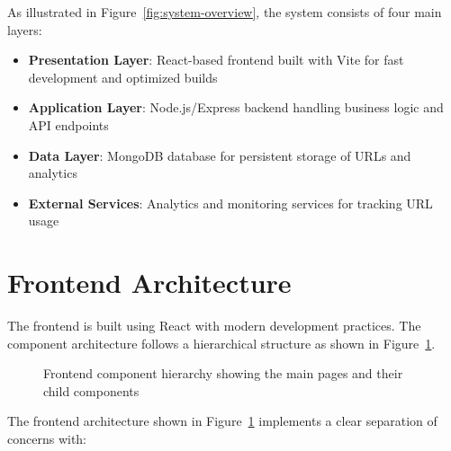 \documentclass[11pt,a4paper]{article}
\begin{document}
As illustrated in Figure~\ref{fig:system-overview}, the system consists of four main layers:

\begin{itemize}
    \item \textbf{Presentation Layer}: React-based frontend built with Vite for fast development and optimized builds
    \item \textbf{Application Layer}: Node.js/Express backend handling business logic and API endpoints
    \item \textbf{Data Layer}: MongoDB database for persistent storage of URLs and analytics
    \item \textbf{External Services}: Analytics and monitoring services for tracking URL usage
\end{itemize}

\section{Frontend Architecture}

The frontend is built using React with modern development practices. The component architecture follows a hierarchical structure as shown in Figure~\ref{fig:frontend-architecture}.

\begin{figure}[!htbp]
\centering
{}
\caption{Frontend component hierarchy showing the main pages and their child components}
\label{fig:frontend-architecture}
\end{figure}

The frontend architecture shown in Figure~\ref{fig:frontend-architecture} implements a clear separation of concerns with:
\end{document}
